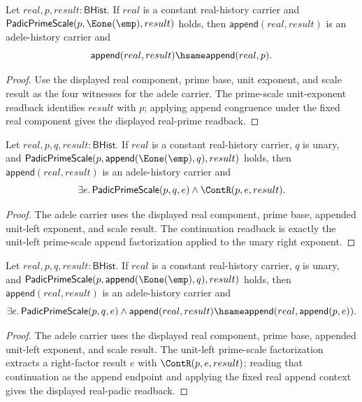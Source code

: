 \begin{theorem}
\label{thm:adele-history-carrier-unit-scale-real-prime-readback}
Let $real,p,result:\mathsf{BHist}$. If $real$ is a constant real-history
carrier and $\mathsf{PadicPrimeScale}(p,\Eone(\emp),result)$ holds, then
$\mathsf{append}(real,result)$ is an adele-history carrier and
$$
\mathsf{append}(real,result)\hsame\mathsf{append}(real,p).
$$
\end{theorem}
\begin{proof}
Use the displayed real component, prime base, unit exponent, and scale result
as the four witnesses for the adele carrier. The prime-scale unit-exponent
readback identifies $result$ with $p$; applying append congruence under the
fixed real component gives the displayed real-prime readback.
\end{proof}

\begin{theorem}
\label{thm:adele-unit-left-scale-cont-readback}
Let $real,p,q,result:\mathsf{BHist}$. If $real$ is a constant real-history
carrier, $q$ is unary, and
$\mathsf{PadicPrimeScale}(p,\mathsf{append}(\Eone(\emp),q),result)$ holds,
then $\mathsf{append}(real,result)$ is an adele-history carrier and
$$
\exists e.\,\mathsf{PadicPrimeScale}(p,q,e)\land\ContR(p,e,result).
$$
\end{theorem}
\begin{proof}
The adele carrier uses the displayed real component, prime base, appended
unit-left exponent, and scale result. The continuation readback is exactly the
unit-left prime-scale append factorization applied to the unary right exponent.
\end{proof}

\begin{theorem}
\label{thm:adele-history-carrier-unit-left-scale-append-readback}
Let $real,p,q,result:\mathsf{BHist}$. If $real$ is a constant real-history
carrier, $q$ is unary, and
$\mathsf{PadicPrimeScale}(p,\mathsf{append}(\Eone(\emp),q),result)$ holds,
then $\mathsf{append}(real,result)$ is an adele-history carrier and
$$
\exists e.\,
\mathsf{PadicPrimeScale}(p,q,e)\land
\mathsf{append}(real,result)\hsame
\mathsf{append}(real,\mathsf{append}(p,e)).
$$
\end{theorem}
\begin{proof}
The adele carrier uses the displayed real component, prime base, appended
unit-left exponent, and scale result. The unit-left prime-scale factorization
extracts a right-factor result $e$ with $\ContR(p,e,result)$; reading that
continuation as the append endpoint and applying the fixed real append context
gives the displayed real-padic readback.
\end{proof}

